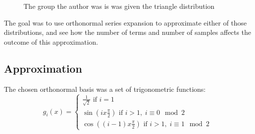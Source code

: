\begin{figure}[h!]
\begin{center}
\end{center}
\caption{The group the author was is was given the triangle distribution}
\end{figure}

The goal was to use orthonormal series expansion to approximate either of those distributions, and see how the number of terms and number of samples affects the outcome of this approximation. 
\subsection{Approximation}
The chosen orthonormal basis was a set of trigonometric functions:
\begin{equation}
    g_i(x) = \begin{cases}
        \frac{1}{\sqrt{2}}\text{ if } i = 1\\
        \sin{(ix\frac{\pi}{2})} \text{ if } i > 1,\;  i \equiv 0 \mod{2}\\
        \cos{((i-1)x\frac{\pi}{2})} \text{ if } i > 1,\;  i \equiv 1 \mod{2}
    \end{cases}
\end{equation}


